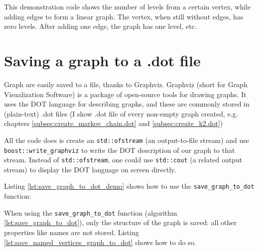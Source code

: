 This demonstration code shows the number of levels from a certain vertex,
 while adding edges to form a linear graph.
 The vertex, when still without edges, has zero levels.
 After adding one edge, the graph has one level, etc.



\section{Saving a graph to a .dot file}
\label{subsec:save_graph_to_dot}

Graph are easily saved to a file, thanks to Graphviz.
Graphviz 
(short for Graph Visualization Software) is a package of open-source tools
for drawing graphs.
It uses the DOT language for describing graphs, and these are commonly
stored in (plain-text) .dot files (I show .dot file of every non-empty graph
created, e.g.
chapters \ref{subsec:create_markov_chain.dot}
and \ref{subsec:create_k2.dot})



All the code does is create an \verb;std::ofstream; 
(an output-to-file stream) 
and use 
\verb;boost::write_graphviz; 
to write the DOT description of our graph to that stream.
Instead of \verb;std::ofstream;, 
one could use \verb;std::cout; 
(a related output stream) to display the DOT language on screen directly.

Listing \ref{lst:save_graph_to_dot_demo}
shows how to use the \verb;save_graph_to_dot; function:



When using the \verb;save_graph_to_dot; function 
(algorithm \ref{lst:save_graph_to_dot}), 
only the structure of the graph is saved: all other properties like names
are not stored.
Listing \ref{lst:save_named_vertices_graph_to_dot}
shows how to do so.

